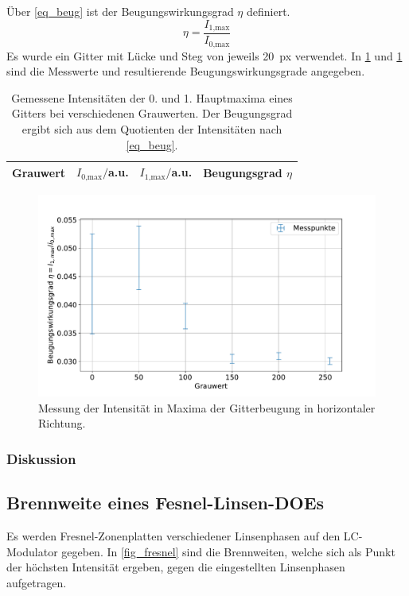\documentclass[
	a4paper,
	12pt,
	pagesize,
	ngerman
]{scrartcl}
\begin{document}
		Über \cref{eq_beug} ist der Beugungswirkungsgrad $\eta$ definiert.
		\begin{equation}
			\label{eq_beug}
			\eta = \frac{I_\text{1,max}}{I_\text{0,max}}
		\end{equation}
		Es wurde ein Gitter mit Lücke und Steg von jeweils \SI{20}{px} verwendet.
		In \cref{tb_beug} und \cref{fig_beug} sind die Messwerte und resultierende Beugungswirkungsgrade angegeben.
\begin{table}[H]
		\centering
		\begin{tabular}{ c | c | c | c }
			 Grauwert & $I_\text{0,max}/$a.u. &$I_\text{1,max}/$a.u.&  Beugungsgrad $\eta$ \\ \hline
			 
		\end{tabular}
		\caption{
		Gemessene Intensitäten der 0. und 1. Hauptmaxima eines Gitters bei verschiedenen Grauwerten.
		Der Beugungsgrad ergibt sich aus dem Quotienten der Intensitäten nach \cref{eq_beug}.
		}
		\label{tb_beug}
\end{table}
\begin{figure}[H] %
			\includegraphics[width=0.8\linewidth]{img/beugungsgrad}
			\caption{
			Messung der Intensität in Maxima der Gitterbeugung in horizontaler Richtung.
			}
			\label{fig_beug}
	\end{figure}
			\subsubsection*{Diskussion}

		\subsection{Brennweite eines Fesnel-Linsen-DOEs}
		Es werden Fresnel-Zonenplatten verschiedener Linsenphasen auf den LC-Modulator gegeben.
		In \cref{fig_fresnel} sind die Brennweiten, welche sich als Punkt der höchsten Intensität ergeben, gegen die eingestellten Linsenphasen aufgetragen.
\end{document}
